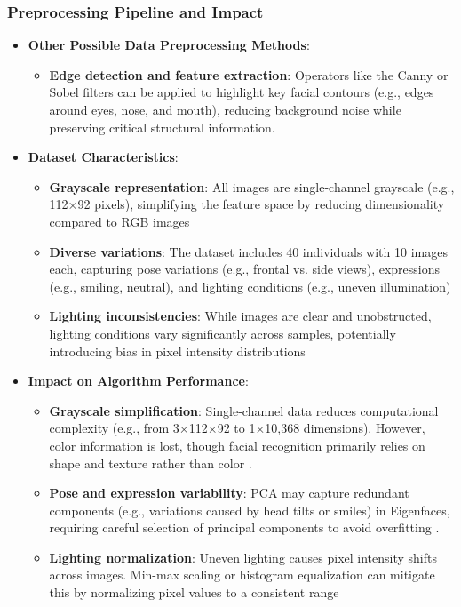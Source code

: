\documentclass{article}
\begin{document}
	\subsubsection{Preprocessing Pipeline and Impact}
	\begin{itemize}
		\item \textbf{Other Possible Data Preprocessing Methods}:
		\begin{itemize}
			\item \textbf{Edge detection and feature extraction}: Operators like the Canny or Sobel filters can be applied to highlight key facial contours (e.g., edges around eyes, nose, and mouth), reducing background noise while preserving critical structural information.
		\end{itemize}
		
		\item \textbf{Dataset Characteristics}:
		\begin{itemize}
			\item \textbf{Grayscale representation}: All images are single-channel grayscale (e.g., 112×92 pixels), simplifying the feature space by reducing dimensionality compared to RGB images 
			\item \textbf{Diverse variations}: The dataset includes 40 individuals with 10 images each, capturing pose variations (e.g., frontal vs. side views), expressions (e.g., smiling, neutral), and lighting conditions (e.g., uneven illumination) 
			\item \textbf{Lighting inconsistencies}: While images are clear and unobstructed, lighting conditions vary significantly across samples, potentially introducing bias in pixel intensity distributions 
		\end{itemize}
		
		\item \textbf{Impact on Algorithm Performance}:
		\begin{itemize}
			\item \textbf{Grayscale simplification}: Single-channel data reduces computational complexity (e.g., from 3×112×92 to 1×10,368 dimensions). However, color information is lost, though facial recognition primarily relies on shape and texture rather than color \cite{Kanan2012}.
			\item \textbf{Pose and expression variability}: PCA may capture redundant components (e.g., variations caused by head tilts or smiles) in Eigenfaces, requiring careful selection of principal components to avoid overfitting \cite{Hill2007}. 
			\item \textbf{Lighting normalization}: Uneven lighting causes pixel intensity shifts across images. Min-max scaling or histogram equalization can mitigate this by normalizing pixel values to a consistent range
		\end{itemize}
	\end{itemize}
	
\end{document}
